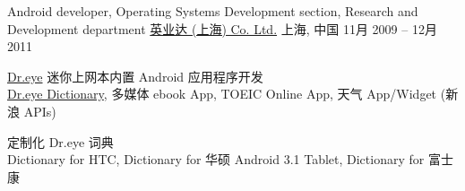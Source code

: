 \begin{cventries}
	\cventry
	{Android developer, Operating Systems Development section, Research and Development department}
	{\href{http://www.inventec.com/english/indexEN.htm}{英业达 (上海) Co. Ltd.}}
	{上海, \enskip 中国}
	{11月 2009 – 12月 2011}
	{
		\begin{cvitems}
			\item {\href{http://www.androidcentral.com/android-powered-dr-eye-makes-its-debut}{Dr.eye} 迷你上网本内置 Android 应用程序开发\\
			\href{https://play.google.com/store/apps/details?id=com.inventec.dreye.dictnew}{Dr.eye Dictionary}, 多媒体 ebook App, TOEIC Online App, 天气 App/Widget (新浪 APIs)}
			\item {定制化 Dr.eye 词典\\
			Dictionary for HTC, Dictionary for 华硕 Android 3.1 Tablet, Dictionary for 富士康}
		\end{cvitems}
	}
\end{cventries}

